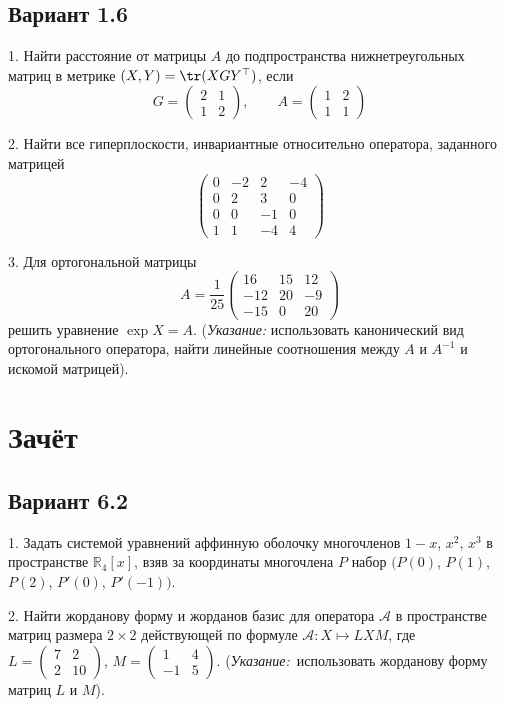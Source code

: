 \documentclass[a4paper]{article}
\newcommand{\No}{\textnumero}
\begin{document}
\subsection{Вариант 1.6}

1. Найти расстояние от матрицы $A$ до подпространства
нижнетреугольных матриц в метрике $(X, Y)=\tr (XGY^\top)$, если
$$
G=\left(\begin{array}{rr} 2 & 1\\
1 & 2
\end{array}\right) ,\qquad
A=\left(
\begin{array}{rr} 1 & 2\\
1 & 1
\end{array}\right)
$$

2. Найти все гиперплоскости, инвариантные относительно оператора,
заданного матрицей
$$
\left(
\begin{array}{rrrr}
0 & -2& 2 & -4\\
0 & 2 & 3 & 0\\
0 & 0 & -1 &0 \\
1 & 1 & -4 &4
\end{array}\right )
$$

3. Для ортогональной матрицы
$$
A=\frac{1}{25} \left(
\begin{array}{rrr}
16 & 15 & 12\\
-12 & 20 & -9 \\
-15 & 0 & 20
\end{array}\right)
$$
решить уравнение $\exp X=A$. ({\it Указание:} использовать
канонический вид ортогонального оператора, найти линейные
соотношения между $A$ и $A^{-1}$  и искомой матрицей).

\section{Зачёт \No 2}

\subsection{Вариант 6.2}

1. Задать системой уравнений аффинную оболочку многочленов $1-x$,
$x^2$, $x^3$ в пространстве $\mathbb{R}_4[x]$, взяв за координаты
многочлена $P$ набор $(P(0)$, $P(1)$, $P(2)$, $P'(0)$, $P'(-1))$.

2. Найти жорданову форму и жорданов базис для оператора
$\mathcal{A}$ в пространстве матриц размера $2\times 2$
действующей по формуле $\mathcal{A}: X \longmapsto LXM$, где
$L=\left(\begin{array}{rr} 7 & 2 \\ 2 & 10 \end{array}\right)$,
$M=\left(\begin{array}{rr} 1 & 4 \\ -1 & 5 \end{array}\right)$.
({\it Указание:}\ использовать жорданову форму матриц $L$ и $M$).
\end{document}
